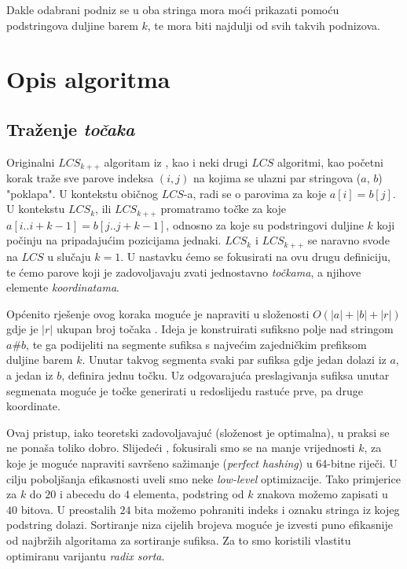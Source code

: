 \documentclass[times, utf8, seminar, numeric]{fer}
\begin{document}
Dakle odabrani podniz se u oba stringa mora moći prikazati pomoću
podstringova duljine barem $k$, te mora biti najdulji od svih takvih
podnizova.

\chapter{Opis algoritma}

\section{Traženje \emph{točaka}}
Originalni $LCS_{k++}$ algoritam iz \cite{Pavetic}, kao  i neki
drugi $LCS$ algoritmi, kao početni korak traže sve parove indeksa $(i,
j)$ na kojima se ulazni par stringova ($a$, $b$) "poklapa". U
kontekstu običnog $LCS$-a, radi se o parovima za koje $a[i] = b[j]$.  U
kontekstu $LCS_k$, ili $LCS_{k++}$ promatramo točke za koje $a[i..i+k-1] =
b[j..j+k-1]$, odnosno za koje su podstringovi duljine $k$ koji počinju
na pripadajućim pozicijama jednaki. $LCS_k$ i $LCS_{k++}$ se naravno svode
na $LCS$ u slučaju $k = 1$. U nastavku ćemo se fokusirati na ovu drugu
definiciju, te ćemo parove koji je zadovoljavaju zvati jednostavno
\emph{točkama}, a njihove elemente \emph{koordinatama}.

Općenito rješenje ovog koraka moguće je napraviti u složenosti $O(|a|
+ |b| + |r|)$ gdje je $|r|$ ukupan broj točaka \cite{poljaci}.  Ideja
je konstruirati sufiksno polje nad stringom $a\#b$, te ga podijeliti
na segmente sufiksa s najvećim zajedničkim prefiksom duljine barem
$k$. Unutar takvog segmenta svaki par sufiksa gdje jedan dolazi iz
$a$, a jedan iz $b$, definira jednu točku. Uz odgovarajuća
preslagivanja sufiksa unutar segmenata moguće je točke generirati u
redoslijedu rastuće prve, pa druge koordinate.

Ovaj pristup, iako teoretski zadovoljavajuć (složenost je optimalna),
u praksi se ne ponaša toliko dobro. Slijedeći \cite{Pavetic},
fokusirali smo se na manje vrijednosti $k$, za koje
je moguće napraviti savršeno sažimanje (\emph{perfect hashing}) u
64-bitne riječi. U cilju poboljšanja efikasnosti uveli smo neke
\emph{low-level} optimizacije. Tako primjerice za $k$ do $20$ i abecedu
do $4$ elementa, podstring od $k$ znakova možemo zapisati u $40$
bitova.  U preostalih $24$ bita možemo pohraniti indeks i oznaku
stringa iz kojeg podstring dolazi. Sortiranje niza cijelih brojeva
moguće je izvesti puno efikasnije od najbržih algoritama za
sortiranje sufiksa. Za to smo koristili vlastitu optimiranu varijantu
\emph{radix sorta}.
\end{document}
